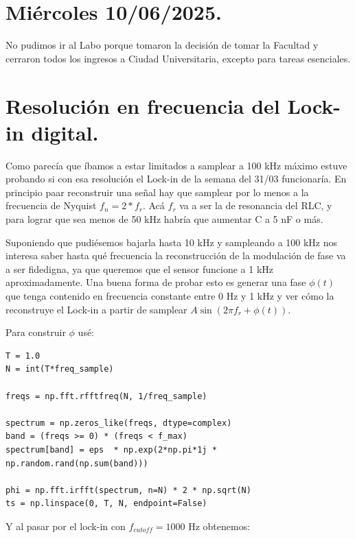 \section{Miércoles 10/06/2025.}
No pudimos ir al Labo porque tomaron la decisión de tomar la Facultad y cerraron todos los ingresos a Ciudad Universitaria, excepto para tareas esenciales. 

\section{Resolución en frecuencia del Lock-in digital.}
Como parecía que íbamos a estar limitados a samplear a 100 kHz máximo estuve probando si con esa resolución el Lock-in de la semana del 31/03 funcionaría. En principio paar reconstruir una señal hay que samplear por lo menos a la frecuencia de Nyquist $f_n = 2*f_r$. Acá $f_r$ va a ser la de resonancia del RLC, y para lograr que sea menos de 50 kHz habría que aumentar C a 5 nF o más. 

Suponiendo que pudiésemos bajarla hasta 10 kHz y sampleando a 100 kHz nos interesa saber hasta qué frecuencia la reconstrucción de la modulación de fase va a ser fidedigna, ya que queremos que el sensor funcione a 1 kHz aproximadamente. Una buena forma de probar esto es generar una fase $\phi(t)$ que tenga contenido en frecuencia constante entre 0 Hz y 1 kHz y ver cómo la reconstruye el Lock-in a partir de samplear $A\sin(2\pi f_r + \phi(t))$.

Para construir $\phi$ usé: 

\begin{lstlisting}
T = 1.0
N = int(T*freq_sample) 

freqs = np.fft.rfftfreq(N, 1/freq_sample) 

spectrum = np.zeros_like(freqs, dtype=complex)
band = (freqs >= 0) * (freqs < f_max)
spectrum[band] = eps  * np.exp(2*np.pi*1j * np.random.rand(np.sum(band)))  

phi = np.fft.irfft(spectrum, n=N) * 2 * np.sqrt(N)
ts = np.linspace(0, T, N, endpoint=False)

\end{lstlisting}

Y al pasar por el lock-in con $f_{cutoff} = 1000$ Hz obtenemos:
	
